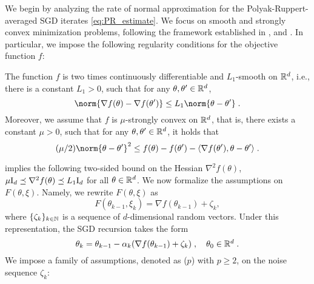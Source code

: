 We begin by analyzing the rate of normal approximation for the Polyak-Ruppert-averaged SGD iterates \eqref{eq:PR_estimate}. We focus on smooth and strongly convex minimization problems, following the framework established in \cite{moulines2011non}, \cite{pmlr-v99-anastasiou19a} and \cite{shao2022berry}. In particular, we impose the following regularity conditions for the objective function $f$:
\begin{assum}
\label{ass:L-smooth}
The function $f$ is two times continuously differentiable and $L_{1}$-smooth on $\mathbb{R}^{d}$, i.e., there is a constant $L_{1} > 0$, such that for any $\theta,\theta' \in \mathbb{R}^{d}$,
\begin{equation}
\label{eq:L-smooth}
\norm{\nabla f(\theta) - \nabla f(\theta')} \leq L_{1} \norm{\theta - \theta'}\eqsp.
\end{equation}
Moreover, we assume that $f$ is $\mu$-strongly convex on $\mathbb{R}^{d}$, that is, there exists a constant $\mu > 0$, such that for any $\theta,\theta' \in \mathbb{R}^{d}$, it holds that
\begin{equation}
\label{eq:strong_convex}
(\mu/2) \norm{\theta-\theta'}^2 \leq f(\theta) - f(\theta') - \langle \nabla f(\theta'), \theta - \theta' \rangle \eqsp.
\end{equation}
\end{assum}
 implies  the following two-sided bound on the Hessian $\nabla^2 f(\theta)$, $\mu \mathrm{I}_d \preceq \nabla^2 f(\theta) \preceq L_1 \mathrm{I}_d$ for all $\theta \in \mathbb{R}^{d}$. We now formalize the assumptions on $F(\theta, \xi)$. Namely, we rewrite $F(\theta, \xi)$ as  
\begin{equation}
\label{eq: gradF decompositon}
\textstyle 
F(\theta_{k-1}, \xi_k) = \nabla f(\theta_{k-1}) + \zeta_k,  
\end{equation}
where $\{ \zeta_k\}_{k \in \mathbb{N}}$ is a sequence of $d$-dimensional random vectors. Under this representation, the SGD recursion takes the form  
\begin{equation}
\label{eq:sgd_recursion_main_new}
\textstyle
\theta_{k} = \theta_{k-1} - \alpha_{k} (\nabla f(\theta_{k-1}) + \zeta_k) \;, \quad \theta_0 \in \mathbb{R}^{d}\;.
\end{equation}  
We impose a family of assumptions, denoted as ($p$) with $p \geq 2$, on the noise sequence $\zeta_k$:

